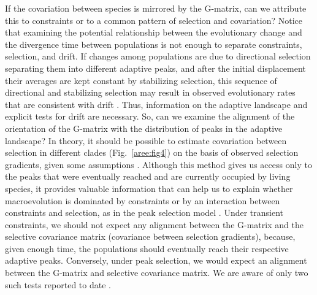 \begin{refsection}
If the covariation between species is mirrored by the G-matrix, can we
attribute this to constraints or to a common pattern of selection and
covariation? Notice that examining the potential relationship between
the evolutionary change and the divergence time between populations is
not enough to separate constraints, selection, and drift. If changes
among populations are due to directional selection separating them into
different adaptive peaks, and after the initial displacement their
averages are kept constant by stabilizing selection, this sequence of
directional and stabilizing selection may result in observed
evolutionary rates that are consistent with drift \parencite{Lemos2001-jr}. 
Thus, information
on the adaptive landscape and explicit tests for drift are necessary.
So, can we examine the alignment of the orientation of the G-matrix with
the distribution of peaks in the adaptive landscape? In theory, it
should be possible to estimate covariation between selection in
different clades (Fig.~\ref{aree:fig4}) on the
basis of observed selection gradients, given some assumptions \parencite{Felsenstein1988-ql, Zeng1988-or}. Although this method
gives us access only to the peaks that were eventually reached and are
currently occupied by living species, it provides valuable information
that can help us to explain whether macroevolution is dominated by
constraints or by an interaction between constraints and selection, as
in the peak selection model \parencite{Marroig2010-be}. Under transient constraints, we should not expect any
alignment between the G-matrix and the selective covariance matrix
(covariance between selection gradients), because, given enough time,
the populations should eventually reach their respective adaptive
peaks. Conversely, under peak selection, we would expect an
alignment between the G-matrix and selective covariance matrix. We are
aware of only two such tests reported to date \parencite{Hohenlohe2008-uk, Marroig2010-be}.


\end{refsection}
